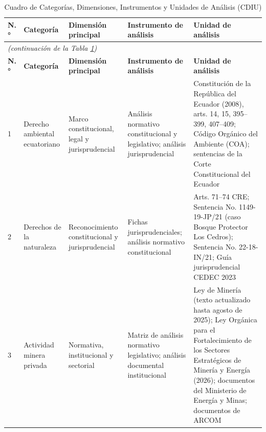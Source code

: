 
\begingroup
\small
\begin{longtable}{|p{}|p{}|p{}|p{}|p{}|}

\caption{Cuadro de Categorías, Dimensiones, Instrumentos y Unidades de Análisis (CDIU)}
\label{tab:cdiu} \\

\hline
\textbf{N.°} & \textbf{Categoría} & \textbf{Dimensión principal} & \textbf{Instrumento de análisis} & \textbf{Unidad de análisis} \\
\hline
\endfirsthead

\multicolumn{5}{l}{\small\textit{(continuación de la Tabla \ref*{tab:cdiu})}} \\[2pt]
\hline
\textbf{N.°} & \textbf{Categoría} & \textbf{Dimensión principal} & \textbf{Instrumento de análisis} & \textbf{Unidad de análisis} \\
\hline
\endhead

\hline
\endfoot

1 &
Derecho ambiental ecuatoriano &
Marco constitucional, legal y jurisprudencial &
Análisis normativo constitucional y legislativo; análisis jurisprudencial &
Constitución de la República del Ecuador (2008), arts. 14, 15, 395--399, 407--409; Código Orgánico del Ambiente (COA); sentencias de la Corte Constitucional del Ecuador \\
\hline

2 &
Derechos de la naturaleza &
Reconocimiento constitucional y jurisprudencial &
Fichas jurisprudenciales; análisis normativo constitucional &
Arts. 71--74 CRE; Sentencia No. 1149-19-JP/21 (caso Bosque Protector Los Cedros); Sentencia No. 22-18-IN/21; Guía jurisprudencial CEDEC 2023 \\
\hline

3 &
Actividad minera privada &
Normativa, institucional y sectorial &
Matriz de análisis normativo legislativo; análisis documental institucional &
Ley de Minería (texto actualizado hasta agosto de 2025); Ley Orgánica para el Fortalecimiento de los Sectores Estratégicos de Minería y Energía (2026); documentos del Ministerio de Energía y Minas; documentos de ARCOM \\
\hline


\end{longtable}
